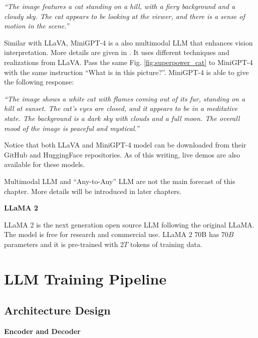 \vspace{0.1in}
\noindent \textit{``The image features a cat standing on a hill, with a fiery background and a cloudy sky. The cat appears to be looking at the viewer, and there is a sense of motion in the scene.''}
\vspace{0.1in}

Similar with LLaVA, MiniGPT-4 is a also multimodal LLM that enhances vision interpretation. More details are given in \cite{zhu2023minigpt}. It uses different techniques and realizations from LLaVA. Pass the same Fig. \ref{fig:superpower_cat} to MiniGPT-4 with the same instruction ``What is in this picture?''. MiniGPT-4 is able to give the following response:

\vspace{0.1in}
\noindent \textit{``The image shows a white cat with flames coming out of its fur, standing on a hill at sunset. The cat’s eyes are closed, and it appears to be in a meditative state. The background is a dark sky with clouds and a full moon. The overall mood of the image is peaceful and mystical.''}
\vspace{0.1in}

Notice that both LLaVA and MiniGPT-4 model can be downloaded from their GitHub and HuggingFace repositories. As of this writing, live demos are also available for these models.

Multimodal LLM and ``Any-to-Any'' LLM are not the main forecast of this chapter. More details will be introduced in later chapters.

\vspace{0.1in}
\noindent \textbf{LLaMA 2}
\vspace{0.1in}

LLaMA 2 is the next generation open source LLM following the original LLaMA. The model is free for research and commercial use. LLaMA 2 70B has $70B$ parameters and it is pre-trained with $2T$ tokens of training data.

\section{LLM Training Pipeline}

\subsection{Architecture Design}

\vspace{0.1in}
\noindent \textbf{Encoder and Decoder}
\vspace{0.1in}

